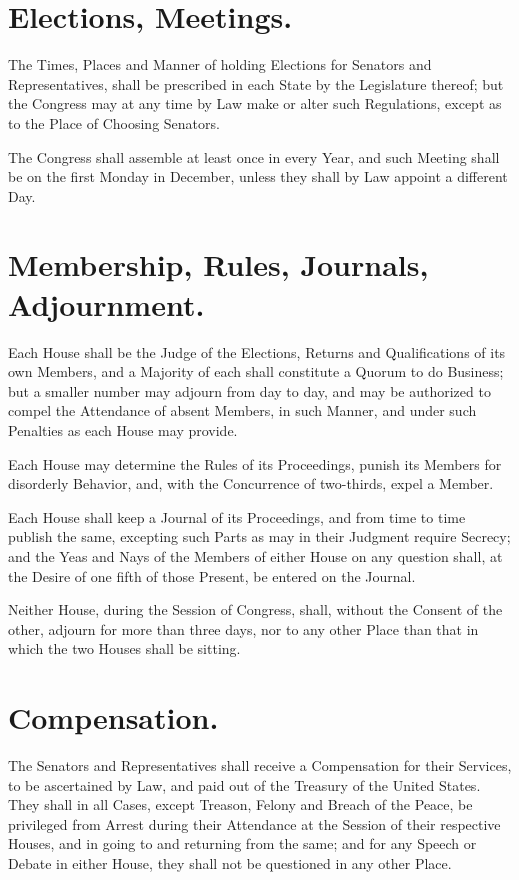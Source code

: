 \documentclass[12pt]{constitution}
\begin{document}
\section{Elections, Meetings.}
The Times, Places and Manner of holding Elections for Senators and
Representatives, shall be prescribed in each State by the Legislature thereof;
but the Congress may at any time by Law make or alter such Regulations, except
as to the Place of Choosing Senators.

The Congress shall assemble at least once in every Year, and such Meeting shall
be on the first Monday in December, unless they shall by Law appoint a
different Day.


\section{Membership, Rules, Journals, Adjournment.}
Each House shall be the Judge of the Elections, Returns and Qualifications of
its own Members, and a Majority of each shall constitute a Quorum to do
Business; but a smaller number may adjourn from day to day, and may be
authorized to compel the Attendance of absent Members, in such Manner, and
under such Penalties as each House may provide.

Each House may determine the Rules of its Proceedings, punish its Members for
disorderly Behavior, and, with the Concurrence of two-thirds, expel a Member.

Each House shall keep a Journal of its Proceedings, and from time to time
publish the same, excepting such Parts as may in their Judgment require
Secrecy; and the Yeas and Nays of the Members of either House on any question
shall, at the Desire of one fifth of those Present, be entered on the Journal.

Neither House, during the Session of Congress, shall, without the Consent of
the other, adjourn for more than three days, nor to any other Place than that
in which the two Houses shall be sitting.


\section{Compensation.}
The Senators and Representatives shall receive a Compensation for their
Services, to be ascertained by Law, and paid out of the Treasury of the United
States. They shall in all Cases, except Treason, Felony and Breach of the
Peace, be privileged from Arrest during their Attendance at the Session of
their respective Houses, and in going to and returning from the same; and for
any Speech or Debate in either House, they shall not be questioned in any other
Place.
\end{document}
